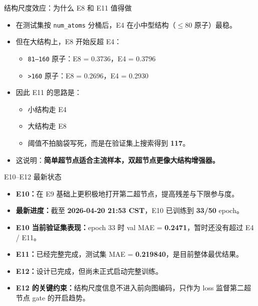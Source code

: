 \documentclass{beamer}
\begin{document}
\begin{frame}{结构尺度效应：为什么 E8 和 E11 值得做}
\small
\begin{itemize}
  \item 在测试集按 \texttt{num\_atoms} 分桶后，E4 在小中型结构（$\le 80$ 原子）最稳。
  \item 但在大结构上，E8 开始反超 E4：
  \begin{itemize}
    \item \texttt{81--160} 原子：E8 = 0.3736，E4 = 0.3796
    \item \texttt{>160} 原子：E8 = 0.2696，E4 = 0.2930
  \end{itemize}
  \item 因此 E11 的思路是：
  \begin{itemize}
    \item 小结构走 E4
    \item 大结构走 E8
    \item 阈值不拍脑袋写死，而是在验证集上搜索得到 \textbf{117}。
  \end{itemize}
  \item 这说明：\textbf{简单超节点适合主流样本，双超节点更像大结构增强器。}
\end{itemize}
\end{frame}

\begin{frame}{E10--E12 最新状态}
\small
\begin{itemize}
  \item \textbf{E10：}在 E9 基础上更积极地打开第二超节点，提高残差与下限参与度。
  \item \textbf{最新进度：}截至 \textbf{2026-04-20 21:53 CST}，E10 已训练到 \textbf{33/50} epoch。
  \item \textbf{E10 当前验证集表现：}epoch 33 时 val MAE = \textbf{0.2471}，暂时还没有超过 E4 / E11。
  \item \textbf{E11：}已经完整完成，测试集 MAE = \textbf{0.219840}，是目前整体最优结果。
  \item \textbf{E12：}设计已完成，但尚未正式启动完整训练。
  \item \textbf{E12 的关键约束：}结构尺度信息不进入前向图编码，只作为 loss 监督第二超节点 gate 的开启趋势。
\end{itemize}
\end{frame}
\end{document}
